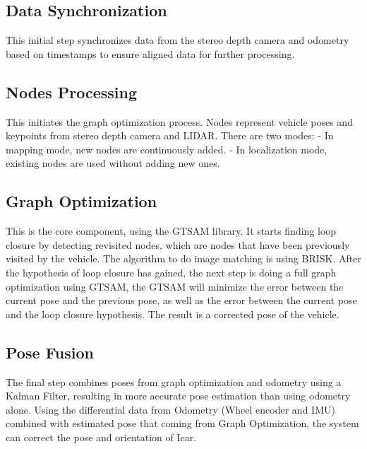 \subsection{Data Synchronization} 
This initial step synchronizes data from the stereo depth camera and odometry based on timestamps to ensure aligned data for further processing.

\subsection{Nodes Processing}
This initiates the graph optimization process. Nodes represent vehicle poses and keypoints from stereo depth camera and LIDAR. There are two modes:
- In mapping mode, new nodes are continuously added.
- In localization mode, existing nodes are used without adding new ones.

\subsection{Graph Optimization} 
This is the core component, using the GTSAM library. It starts finding loop closure by detecting revisited nodes, which are nodes that have been previously visited by the vehicle. The algorithm to do image matching is using BRISK. After the hypothesis of loop closure has gained, the next step is doing a full graph optimization using GTSAM, the GTSAM will minimize the error between the current pose and the previous pose, as well as the error between the current pose and the loop closure hypothesis. The result is a corrected pose of the vehicle.

\subsection{Pose Fusion} 
The final step combines poses from graph optimization and odometry using a Kalman Filter, resulting in more accurate pose estimation than using odometry alone. Using the differential data from Odometry (Wheel encoder and IMU) combined with estimated pose that coming from Graph Optimization, the system can correct the pose and orientation of Icar.

